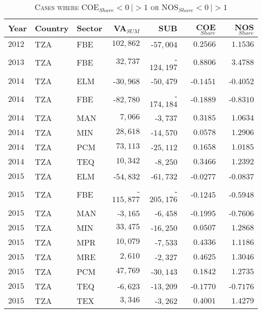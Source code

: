 \documentclass[a4paper]{article}
\begin{document}
\begin{table}[h!] \centering 
  \caption{\textsc{Cases where COE$_{Share} < 0\ | > 1$ or NOS$_{Share} < 0\ | > 1$}} 
  \label{tab:VADEC_OUTL} 
    \vspace{2mm}
\begin{tabular}{lllrrrr} \toprule
Year & Country & Sector & VA$_{SUM}$ & SUB & COE$_{Share}$ & NOS$_{Share}$ \\ \midrule
$2012$ & TZA & FBE & $102,862$ & -$57,004$ & $0.2566$ & $1.1536$ \\ 
$2013$ & TZA & FBE & $32,737$ & -$124,197$ & $0.8806$ & $3.4788$ \\ 
$2014$ & TZA & ELM & -$30,968$ & -$50,479$ & -$0.1451$ & -$0.4052$ \\ 
$2014$ & TZA & FBE & -$82,780$ & -$174,184$ & -$0.1889$ & -$0.8310$ \\ 
$2014$ & TZA & MAN & $7,066$ & -$3,737$ & $0.3185$ & $1.0634$ \\ 
$2014$ & TZA & MIN & $28,618$ & -$14,570$ & $0.0578$ & $1.2906$ \\ 
$2014$ & TZA & PCM & $73,113$ & -$25,112$ & $0.1658$ & $1.0185$ \\ 
$2014$ & TZA & TEQ & $10,342$ & -$8,250$ & $0.3466$ & $1.2392$ \\ 
$2015$ & TZA & ELM & -$54,832$ & -$61,732$ & -$0.0277$ & -$0.0837$ \\ 
$2015$ & TZA & FBE & -$115,877$ & -$205,176$ & -$0.1245$ & -$0.5948$ \\ 
$2015$ & TZA & MAN & -$3,165$ & -$6,458$ & -$0.1995$ & -$0.7606$ \\ 
$2015$ & TZA & MIN & $33,475$ & -$16,250$ & $0.0507$ & $1.2868$ \\ 
$2015$ & TZA & MPR & $10,079$ & -$7,533$ & $0.4336$ & $1.1186$ \\ 
$2015$ & TZA & MRE & $2,610$ & -$2,327$ & $0.4625$ & $1.3046$ \\ 
$2015$ & TZA & PCM & $47,769$ & -$30,143$ & $0.1842$ & $1.2735$ \\ 
$2015$ & TZA & TEQ & -$6,623$ & -$13,209$ & -$0.1770$ & -$0.7176$ \\ 
$2015$ & TZA & TEX & $3,346$ & -$3,262$ & $0.4001$ & $1.4279$ \\ \bottomrule
\end{tabular} 
\end{table} 
\FloatBarrier
\end{document}
